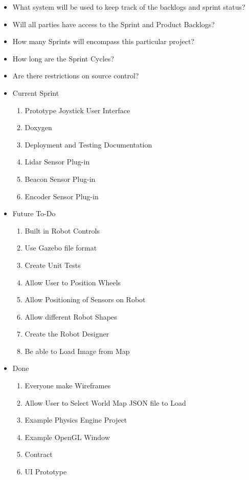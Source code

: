 \begin{itemize}
\item What system will be used to keep track of the backlogs and sprint status?
\item Will all parties have access to the Sprint and Product Backlogs?
\item How many Sprints will encompass this particular project?
\item How long are the Sprint Cycles?
\item Are there restrictions on source control? 
\end{itemize}

\begin{itemize}
\item Current Sprint 
\begin{enumerate}
\item Prototype Joystick User Interface
\item Doxygen
\item Deployment and Testing Documentation
\item Lidar Sensor Plug-in
\item Beacon Sensor Plug-in
\item Encoder Sensor Plug-in
\end{enumerate}
\item Future To-Do 
\begin{enumerate}
\item Built in Robot Controls 
\item Use Gazebo file format
\item Create Unit Tests
\item Allow User to Position Wheels
\item Allow Positioning of Sensors on Robot
\item Allow different Robot Shapes
\item Create the Robot Designer
\item Be able to Load Image from Map
\end{enumerate}
\item Done
\begin{enumerate}
\item Everyone make Wireframes
\item Allow User to Select World Map JSON file to Load
\item Example Physics Engine Project
\item Example OpenGL Window
\item Contract
\item UI Prototype

\end{enumerate}
\end{itemize}
